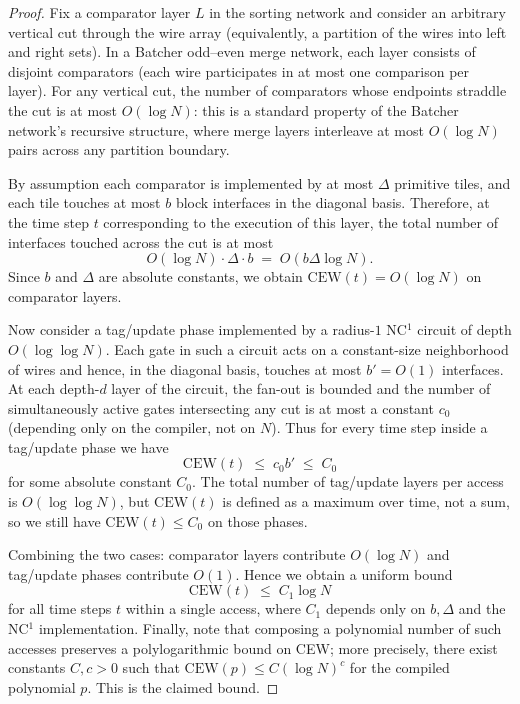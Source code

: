 \documentclass[12pt]{article}
\theoremstyle{definition}
\theoremstyle{definition}
\theoremstyle{remark}
\theoremstyle{remark}
\begin{document}
\begin{proof}
Fix a comparator layer $L$ in the sorting network and consider an arbitrary
vertical cut through the wire array (equivalently, a partition of the wires
into left and right sets). In a Batcher odd--even merge network,
each layer consists of disjoint comparators (each wire participates in at most
one comparison per layer). For any vertical cut, the number of comparators
whose endpoints straddle the cut is at most $O(\log N)$: this is a standard
property of the Batcher network's recursive structure, where merge layers
interleave at most $O(\log N)$ pairs across any partition boundary.

By assumption each comparator is implemented by at most $\Delta$ primitive
tiles, and each tile touches at most $b$ block interfaces in the diagonal
basis. Therefore, at the time step $t$ corresponding to the execution of this
layer, the total number of interfaces touched across the cut is at most
\[
  O(\log N) \cdot \Delta \cdot b \;=\; O(b \Delta \log N).
\]
Since $b$ and $\Delta$ are absolute constants, we obtain $\mathrm{CEW}(t) = O(\log N)$
on comparator layers.

Now consider a tag/update phase implemented by a radius-$1$ NC$^1$ circuit of
depth $O(\log\log N)$. Each gate in such a circuit acts on a constant-size
neighborhood of wires and hence, in the diagonal basis, touches at most
$b' = O(1)$ interfaces. At each depth-$d$ layer of the circuit, the fan-out is
bounded and the number of simultaneously active gates intersecting any cut is
at most a constant $c_0$ (depending only on the compiler, not on $N$). Thus
for every time step inside a tag/update phase we have
\[
  \mathrm{CEW}(t) \;\le\; c_0 b' \;\le\; C_0
\]
for some absolute constant $C_0$. The total number of tag/update layers per
access is $O(\log\log N)$, but $\mathrm{CEW}(t)$ is defined as a maximum over
time, not a sum, so we still have $\mathrm{CEW}(t) \le C_0$ on those phases.

Combining the two cases: comparator layers contribute $O(\log N)$ and
tag/update phases contribute $O(1)$. Hence we obtain a uniform bound
\[
  \mathrm{CEW}(t) \;\le\; C_1 \log N
\]
for all time steps $t$ within a single access, where $C_1$ depends only on
$b,\Delta$ and the NC$^1$ implementation. Finally, note that composing a polynomial number of such accesses
preserves a polylogarithmic bound on CEW; more precisely, there exist constants
$C,c>0$ such that $\mathrm{CEW}(p) \le C (\log N)^c$ for the compiled
polynomial $p$. This is the claimed bound.
\end{proof}
\end{document}
